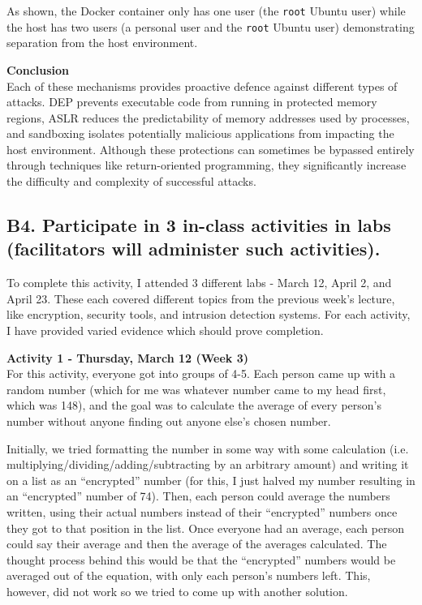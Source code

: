 \documentclass[titlepage]{article}
\begin{document}
        As shown, the Docker container only has one user (the \texttt{root}
        Ubuntu user) while the host has two users (a personal user and the
        \texttt{root} Ubuntu user) demonstrating separation from the host
        environment.

        \bigskip

        \textbf{Conclusion} \\
        Each of these mechanisms provides proactive defence against different
        types of attacks. DEP prevents executable code from running in protected
        memory regions, ASLR reduces the predictability of memory addresses used
        by processes, and sandboxing isolates potentially malicious applications
        from impacting the host environment. Although these protections can
        sometimes be bypassed entirely through techniques like return-oriented
        programming, they significantly increase the difficulty and complexity
        of successful attacks.

    \newpage

    \subsection*{\centering B4. Participate in 3 in-class activities in labs (facilitators will administer such activities).}
        To complete this activity, I attended 3 different labs - March 12, April
        2, and April 23. These each covered different topics from the previous
        week's lecture, like encryption, security tools, and intrusion detection
        systems. For each activity, I have provided varied evidence which should
        prove completion.

        \bigskip

        \textbf{Activity 1 - Thursday, March 12 (Week 3)} \\
        For this activity, everyone got into groups of 4-5. Each person came up
        with a random number (which for me was whatever number came to my head
        first, which was 148), and the goal was to calculate the average of
        every person's number without anyone finding out anyone else's chosen
        number.

        \vspace{0.5em}

        Initially, we tried formatting the number in some way with some
        calculation (i.e. multiplying/dividing/adding/subtracting by an
        arbitrary amount) and writing it on a list as an ``encrypted'' number
        (for this, I just halved my number resulting in an ``encrypted'' number
        of 74). Then, each person could average the numbers written, using their
        actual numbers instead of their ``encrypted'' numbers once they got to
        that position in the list. Once everyone had an average, each person
        could say their average and then the average of the averages calculated.
        The thought process behind this would be that the ``encrypted'' numbers
        would be averaged out of the equation, with only each person's numbers
        left. This, however, did not work so we tried to come up with another
        solution.
\end{document}
